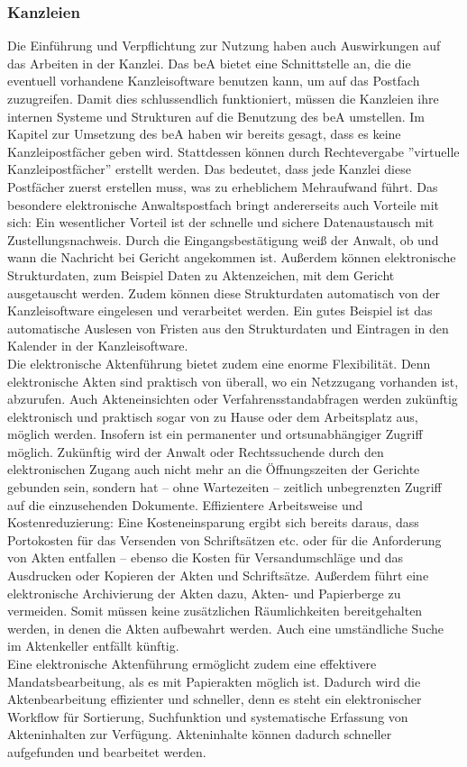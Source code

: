 \subsubsection{Kanzleien}
Die Einführung und Verpflichtung zur Nutzung haben auch Auswirkungen auf das Arbeiten in der Kanzlei. Das beA bietet eine Schnittstelle an, die die eventuell vorhandene Kanzleisoftware benutzen kann, um auf das Postfach zuzugreifen. Damit dies schlussendlich funktioniert, müssen die Kanzleien ihre internen Systeme und Strukturen auf die Benutzung des beA umstellen. Im Kapitel zur Umsetzung des beA haben wir bereits gesagt, dass es keine Kanzleipostfächer geben wird. Stattdessen können durch Rechtevergabe ''virtuelle Kanzleipostfächer'' erstellt werden. Das bedeutet, dass jede Kanzlei diese Postfächer zuerst erstellen muss, was zu erheblichem Mehraufwand führt.  
Das besondere elektronische Anwaltspostfach bringt andererseits auch Vorteile mit sich: Ein wesentlicher Vorteil ist der schnelle und sichere Datenaustausch mit Zustellungsnachweis. Durch die Eingangsbestätigung weiß der Anwalt, ob und wann die Nachricht bei Gericht angekommen ist. Außerdem können elektronische Strukturdaten, zum Beispiel Daten zu Aktenzeichen, mit dem Gericht ausgetauscht werden. Zudem können diese Strukturdaten automatisch von der Kanzleisoftware eingelesen und verarbeitet werden. Ein gutes Beispiel ist das automatische Auslesen von Fristen aus den Strukturdaten und Eintragen in den Kalender in der Kanzleisoftware. \\
Die elektronische Aktenführung bietet zudem eine enorme Flexibilität. Denn elektronische Akten sind praktisch von überall, wo ein Netzzugang vorhanden ist, abzurufen. Auch Akteneinsichten oder Verfahrensstandabfragen werden zukünftig elektronisch und praktisch sogar von zu Hause oder dem Arbeitsplatz aus, möglich werden. Insofern ist ein permanenter und ortsunabhängiger Zugriff möglich. Zukünftig wird der Anwalt oder Rechtssuchende durch den elektronischen Zugang auch nicht mehr an die Öffnungszeiten der Gerichte gebunden sein, sondern hat – ohne Wartezeiten –  zeitlich unbegrenzten Zugriff auf die einzusehenden Dokumente.
Effizientere Arbeitsweise und Kostenreduzierung: Eine Kosteneinsparung ergibt sich bereits daraus, dass Portokosten für das Versenden von Schriftsätzen etc. oder für die Anforderung von Akten entfallen – ebenso die Kosten für Versandumschläge und das Ausdrucken oder Kopieren der Akten und Schriftsätze. Außerdem führt eine elektronische Archivierung der Akten dazu, Akten- und Papierberge zu vermeiden. Somit müssen keine zusätzlichen Räumlichkeiten bereitgehalten werden, in denen die Akten aufbewahrt werden. Auch eine umständliche Suche im Aktenkeller entfällt künftig. \\
Eine elektronische Aktenführung ermöglicht zudem eine effektivere Mandatsbearbeitung, als es mit Papierakten möglich ist. Dadurch wird die Aktenbearbeitung effizienter und schneller, denn es steht ein elektronischer Workflow für Sortierung, Suchfunktion und systematische Erfassung von Akteninhalten zur Verfügung. Akteninhalte können dadurch schneller aufgefunden und bearbeitet werden.

